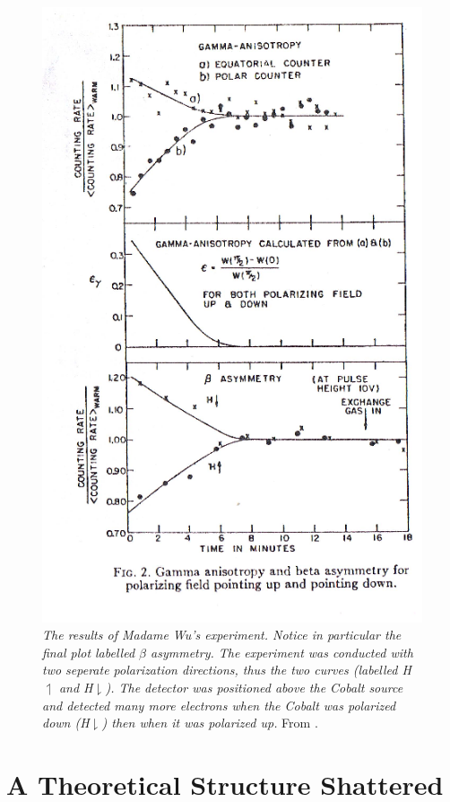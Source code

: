 \documentclass[12pt]{book}
\begin{document}
\begin{figure}
\center
\includegraphics{figures/wu.eps}
\caption{\textit{The results of Madame Wu's experiment. Notice in particular the final plot labelled $\beta$ asymmetry. The experiment was conducted with two seperate polarization directions, thus the two curves (labelled H$\upharpoonleft$ and H$\downharpoonright$). The detector was positioned above the Cobalt source and detected many more electrons when the Cobalt was polarized down (H$\downharpoonright$) then when it was polarized up.} From \cite{wu}.}
\end{figure}

\section{A Theoretical Structure Shattered}
\end{document}

